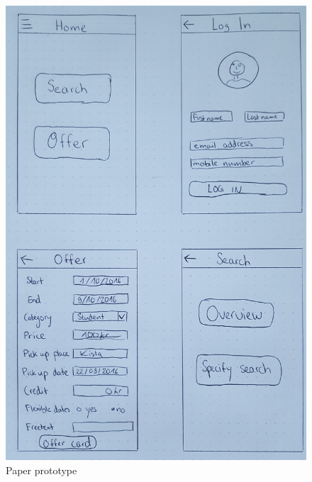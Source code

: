 \documentclass[11pt,twoside,a4paper]{report}
\begin{document}
\begin{figure}
	\centering
	\includegraphics[width=\textwidth]{Paper_prototype1.jpg}
	\caption{Paper prototype}
\end{figure}
\end{document}
